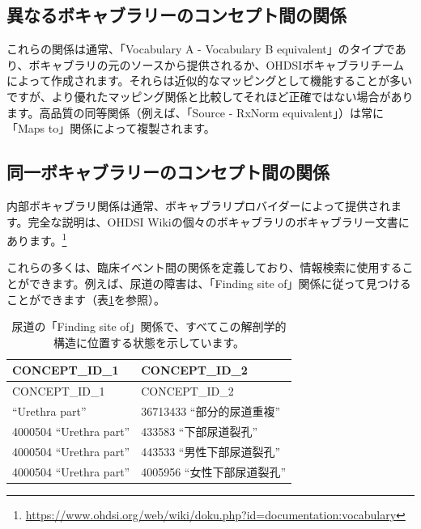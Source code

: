 \documentclass[
  11pt]{book}
\theoremstyle{definition}
\theoremstyle{definition}
\theoremstyle{definition}
\theoremstyle{definition}
\theoremstyle{remark}
\begin{document}
\subsection{異なるボキャブラリーのコンセプト間の関係}\label{ux7570ux306aux308bux30dcux30adux30e3ux30d6ux30e9ux30eaux30fcux306eux30b3ux30f3ux30bbux30d7ux30c8ux9593ux306eux95a2ux4fc2}

これらの関係は通常、「Vocabulary A - Vocabulary B equivalent」のタイプであり、ボキャブラリの元のソースから提供されるか、OHDSIボキャブラリチームによって作成されます。それらは近似的なマッピングとして機能することが多いですが、より優れたマッピング関係と比較してそれほど正確ではない場合があります。高品質の同等関係（例えば、「Source - RxNorm equivalent」）は常に「Maps to」関係によって複製されます。

\subsection{同一ボキャブラリーのコンセプト間の関係}\label{ux540cux4e00ux30dcux30adux30e3ux30d6ux30e9ux30eaux30fcux306eux30b3ux30f3ux30bbux30d7ux30c8ux9593ux306eux95a2ux4fc2}

内部ボキャブラリ関係は通常、ボキャブラリプロバイダーによって提供されます。完全な説明は、OHDSI Wikiの個々のボキャブラリのボキャブラリー文書にあります。\footnote{\url{https://www.ohdsi.org/web/wiki/doku.php?id=documentation:vocabulary}}

これらの多くは、臨床イベント間の関係を定義しており、情報検索に使用することができます。例えば、尿道の障害は、「Finding site of」関係に従って見つけることができます（表\ref{tab:findingSite}を参照）。

\begin{longtable}[]{@{}ll@{}}
\caption{\label{tab:findingSite} 尿道の「Finding site of」関係で、すべてこの解剖学的構造に位置する状態を示しています。}\tabularnewline
\toprule\noalign{}
CONCEPT\_ID\_1 & CONCEPT\_ID\_2 \\
\midrule\noalign{}
\endfirsthead
\toprule\noalign{}
CONCEPT\_ID\_1 & CONCEPT\_ID\_2 \\
\midrule\noalign{}
\endhead
\bottomrule\noalign{}
\endlastfoot
4000504 ``Urethra part'' & 36713433 ``部分的尿道重複'' \\
4000504 ``Urethra part'' & 433583 ``下部尿道裂孔'' \\
4000504 ``Urethra part'' & 443533 ``男性下部尿道裂孔'' \\
4000504 ``Urethra part'' & 4005956 ``女性下部尿道裂孔'' \\
\end{longtable}
\end{document}
